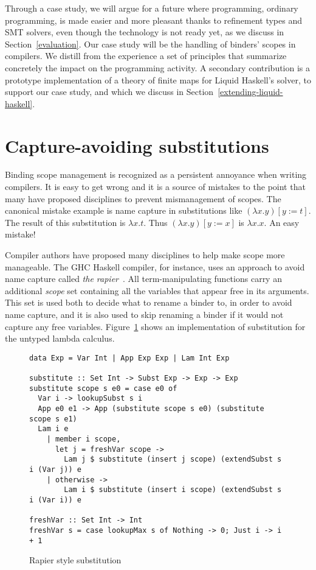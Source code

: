 \documentclass[sigconf, review]{acmart}
\begin{document}
Through a case study, we will argue for a future where programming, ordinary
programming, is made easier and more pleasant thanks to refinement types and
SMT solvers, even though the technology is not ready yet, as we discuss
in Section~\ref{evaluation}. Our case study
will be the handling of binders' scopes in compilers. We distill from the experience
a set of principles that summarize concretely the impact on the programming activity.
A secondary contribution
is a prototype implementation of a theory of finite maps for Liquid Haskell's
solver, to support our case study, and which we discuss in
Section~\ref{extending-liquid-haskell}.

\section{Capture-avoiding substitutions}
\label{capture-avoiding-substitution}

Binding scope management is recognized as a persistent annoyance when writing compilers.
It is easy to get wrong and it is a source of mistakes to the point that many have
proposed disciplines to prevent mismanagement of scopes.
The canonical mistake example is name capture in substitutions like
$(\lambda x. y)[y:=t]$. The result of this substitution is $\lambda x. t$.
Thus $(\lambda x. y)[y:=x]$ is $\lambda x. x$. An easy mistake!

Compiler authors have proposed many disciplines to help make scope more
manageable.
The GHC Haskell compiler, for instance, uses an approach to avoid name capture called
\textit{the rapier}~\cite{peytonjones02secrets}. All term-manipulating functions
carry an additional \textit{scope} set containing all the
variables that appear free in its arguments. This set is
used both to decide what to rename a binder to, in order to avoid name capture,
and it is also used to skip renaming a binder if it would not capture any free
variables. Figure~\ref{rapier-style-substitution} shows an implementation of
substitution
for the untyped lambda calculus.

\begin{figure}
\begin{verbatim}
data Exp = Var Int | App Exp Exp | Lam Int Exp

substitute :: Set Int -> Subst Exp -> Exp -> Exp
substitute scope s e0 = case e0 of
  Var i -> lookupSubst s i
  App e0 e1 -> App (substitute scope s e0) (substitute scope s e1)
  Lam i e
    | member i scope,
      let j = freshVar scope ->
        Lam j $ substitute (insert j scope) (extendSubst s i (Var j)) e
    | otherwise ->
        Lam i $ substitute (insert i scope) (extendSubst s i (Var i)) e

freshVar :: Set Int -> Int
freshVar s = case lookupMax s of Nothing -> 0; Just i -> i + 1
\end{verbatim}
\caption{Rapier style substitution}
\label{rapier-style-substitution}
\end{figure}
\end{document}
